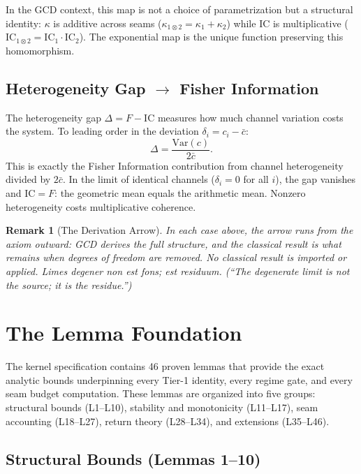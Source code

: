 \documentclass[
  aps,
  prd,
  preprint,
  superscriptaddress,
  nofootinbib,
  floatfix,
  longbibliography
]{revtex4-2}
\newtheorem{remark}{Remark}
\newcommand{\beq}{\begin{equation}}
\newcommand{\eeq}{\end{equation}}
\newcommand{\IC}{\mathrm{IC}}
\newcommand{\Fid}{F}
\newcommand{\Logint}{\kappa}
\newcommand{\hetgap}{\Delta}
\newcommand{\lat}[1]{\textit{#1}}
\begin{document}
In the GCD context, this map is not a choice of
parametrization but a structural identity:
$\Logint$ is additive across seams
($\Logint_{1 \otimes 2} = \Logint_1 + \Logint_2$)
while $\IC$ is multiplicative
($\IC_{1 \otimes 2} = \IC_1 \cdot \IC_2$).
The exponential map is the unique function preserving
this homomorphism.

\subsection{Heterogeneity Gap $\to$ Fisher Information}

The heterogeneity gap $\hetgap = \Fid - \IC$ measures
how much channel variation costs the system.
To leading order in the deviation $\delta_i = c_i - \bar{c}$:
\beq
  \hetgap = \frac{\mathrm{Var}(c)}{2\bar{c}}.
\eeq
This is exactly the Fisher Information contribution
from channel heterogeneity divided by $2\bar{c}$.
In the limit of identical channels ($\delta_i = 0$
for all $i$), the gap vanishes and $\IC = \Fid$:
the geometric mean equals the arithmetic mean.
Nonzero heterogeneity costs multiplicative coherence.

\begin{remark}[The Derivation Arrow]
In each case above, the arrow runs from the axiom
outward: GCD derives the full structure, and the
classical result is what remains when degrees of
freedom are removed.
No classical result is imported or applied.
\lat{Limes degener non est fons; est residuum.}
(``The degenerate limit is not the source; it is
the residue.'')
\end{remark}

\section{The Lemma Foundation}\label{sec:lemmas}

The kernel specification contains 46 proven lemmas that
provide the exact analytic bounds underpinning every
Tier-1 identity, every regime gate, and every seam
budget computation.
These lemmas are organized into five groups:
structural bounds (L1--L10), stability and monotonicity
(L11--L17), seam accounting (L18--L27), return theory
(L28--L34), and extensions (L35--L46).

\subsection{Structural Bounds (Lemmas 1--10)}
\end{document}
